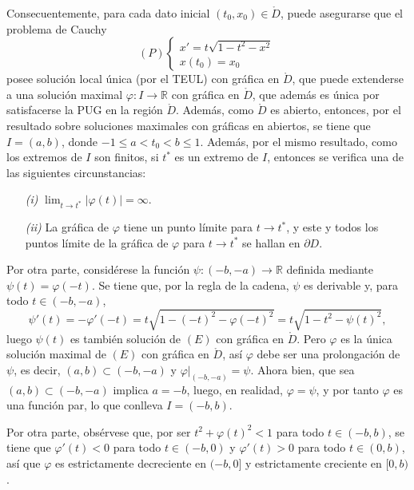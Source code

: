 \documentclass[11pt]{report}
\newcommand{\R}{\mathbb R}
\begin{document}
Consecuentemente, para cada dato inicial $(t_0,x_0) \in \mathring{D}$, puede asegurarse que el problema de Cauchy
\[(P) \begin{cases}
    x'=t\sqrt{1-t^2-x^2}\\
    x(t_0)=x_0
\end{cases}\]
posee solución local única (por el TEUL) con gráfica en $\mathring{D}$, que puede extenderse a una solución maximal $\varphi \colon I \to \R$ con gráfica en $\mathring{D}$, que además es única por satisfacerse la PUG en la región $\mathring{D}$. Además, como $\mathring{D}$ es abierto, entonces, por el resultado sobre soluciones maximales con gráficas en abiertos, se tiene que $I=(a,b)$, donde $-1\leq a <t_0<b\leq 1$. Además, por el mismo resultado, como los extremos de $I$ son finitos, si $t^*$ es un extremo de $I$, entonces se verifica una de las siguientes circunstancias:
\begin{itemize}
    \item[\textit{(i)}] $\lim_{t \to t^*}|\varphi(t)|=\infty$.
    \item[\textit{(ii)}] La gráfica de $\varphi$ tiene un punto límite para $t \to t^*$, y este y todos los puntos límite de la gráfica de $\varphi$ para $t \to t^*$ se hallan en $\partial D$.
\end{itemize}

Por otra parte, considérese la función $\psi \colon (-b,-a) \to \R$ definida mediante $\psi(t)=\varphi(-t)$. Se tiene que, por la regla de la cadena, $\psi$ es derivable y, para todo $t \in (-b,-a)$,
\[\psi'(t)=-\varphi'(-t)=t\sqrt{1-(-t)^2-\varphi(-t)^2}=t\sqrt{1-t^2-\psi(t)^2},\]
luego $\psi(t)$ es también solución de $(E)$ con gráfica en $\mathring{D}$. Pero $\varphi$ es la única solución maximal de $(E)$ con gráfica en $\mathring{D}$, así $\varphi$ debe ser una prolongación de $\psi$, es decir, $(a,b)\subset (-b,-a)$ y $\varphi |_{(-b,-a)}=\psi$. Ahora bien, que sea $(a,b) \subset (-b,-a)$ implica $a=-b$, luego, en realidad, $\varphi=\psi$, y por tanto $\varphi$ es una función par, lo que conlleva $I=(-b,b)$.

\vspace{2mm}

Por otra parte, obsérvese que, por ser $t^2+\varphi(t)^2<1$ para todo $t \in (-b,b)$, se tiene que $\varphi'(t)<0$ para todo $t \in (-b,0)$ y $\varphi'(t)>0$ para todo $t \in (0,b)$, así que $\varphi$ es estrictamente decreciente en $(-b,0]$ y estrictamente creciente en $[0,b)$.

\vspace{2mm}
\end{document}
